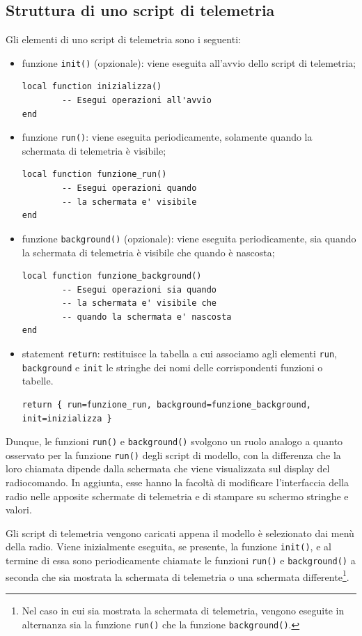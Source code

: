 \documentclass[a4paper, 12pt]{report} %
\begin{document}
\subsection{Struttura di uno script di telemetria}
Gli elementi di uno script di telemetria sono i seguenti:
\begin{itemize}
        \item funzione \texttt{init()} (opzionale): viene eseguita all'avvio dello script di telemetria;
\begin{lstlisting}
local function inizializza()
        -- Esegui operazioni all'avvio
end
\end{lstlisting}
        \item funzione \texttt{run()}: viene eseguita periodicamente, solamente quando la schermata di telemetria è visibile;
\begin{lstlisting}
local function funzione_run()
        -- Esegui operazioni quando
        -- la schermata e' visibile
end
\end{lstlisting}
        \item funzione \texttt{background()} (opzionale): viene eseguita periodicamente, sia quando la schermata di telemetria è visibile che quando è nascosta;
\begin{lstlisting}
local function funzione_background()
        -- Esegui operazioni sia quando
        -- la schermata e' visibile che
        -- quando la schermata e' nascosta
end
\end{lstlisting}

        \item statement \texttt{return}: restituisce la tabella a cui associamo agli elementi \texttt{run}, \texttt{background} e \texttt{init} le stringhe dei nomi delle corrispondenti funzioni o tabelle.
\begin{lstlisting}
return { run=funzione_run, background=funzione_background, init=inizializza }
\end{lstlisting}
\end{itemize}

Dunque, le funzioni \texttt{run()} e \texttt{background()} svolgono un ruolo analogo a quanto osservato per la funzione \texttt{run()} degli script di modello, con la differenza che la loro chiamata dipende dalla schermata che viene visualizzata sul display del radiocomando. In aggiunta, esse hanno la facoltà di modificare l'interfaccia della radio nelle apposite schermate di telemetria e di stampare su schermo stringhe e valori.

Gli script di telemetria vengono caricati appena il modello è selezionato dai menù della radio. Viene inizialmente eseguita, se presente, la funzione \texttt{init()}, e al termine di essa sono periodicamente chiamate le funzioni \texttt{run()} e \texttt{background()} a seconda che sia mostrata la schermata di telemetria o una schermata differente\footnote{\scriptsize Nel caso in cui sia mostrata la schermata di telemetria, vengono eseguite in alternanza sia la funzione \texttt{run()} che la funzione \texttt{background()}.}.
\end{document}
